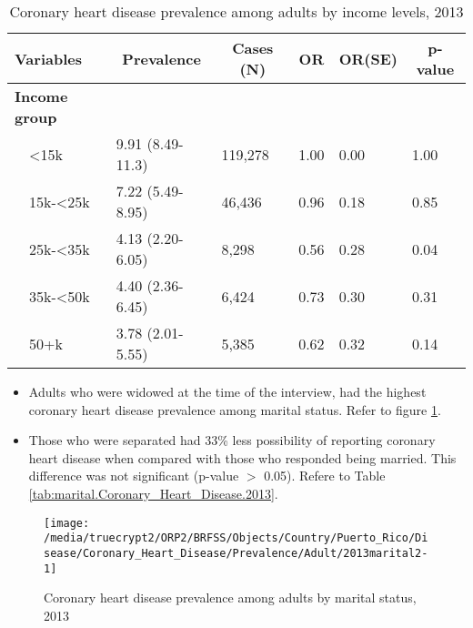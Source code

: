 \begin{table}[H]
\caption{Coronary heart disease prevalence  among adults by income levels, 2013\label{tab:income.Coronary_Heart_Disease.2013}} 
\begin{center}
\begin{tabular}{llllll}
\hline\hline
\multicolumn{1}{l}{Variables}&\multicolumn{1}{c}{Prevalence}&\multicolumn{1}{c}{Cases (N)}&\multicolumn{1}{c}{OR}&\multicolumn{1}{c}{OR(SE)}&\multicolumn{1}{c}{p-value}\tabularnewline
\hline
{\bfseries Income group}&&&&&\tabularnewline
~~\textless15k&9.91 (8.49-11.3)&119,278&1.00&0.00&1.00\tabularnewline
~~15k-\textless25k&7.22 (5.49-8.95)& 46,436&0.96&0.18&0.85\tabularnewline
~~25k-\textless35k&4.13 (2.20-6.05)&  8,298&0.56&0.28&0.04\tabularnewline
~~35k-\textless50k&4.40 (2.36-6.45)&  6,424&0.73&0.30&0.31\tabularnewline
~~50+k&3.78 (2.01-5.55)&  5,385&0.62&0.32&0.14\tabularnewline
\hline
\end{tabular}\end{center}

\end{table}

 \newpage
\begin{itemize}

\item Adults who were 
widowed at the time of the interview, had the highest coronary heart disease prevalence among marital status. Refer to figure \ref{fig:marital.Coronary_Heart_Disease.2013}.

\item Those who were separated had 33\% less possibility of reporting coronary heart disease when compared with those who responded being married. This difference was not significant (p-value $>$ 0.05). Refere to Table \ref{tab:marital.Coronary_Heart_Disease.2013}.

\end{itemize}

\begin{figure}[H]
\caption{Coronary heart disease prevalence among adults by marital status,
         2013}
\label{fig:marital.Coronary_Heart_Disease.2013}
\begin{knitrout}
\color{fgcolor}

{\centering \texttt{[image: /media/truecrypt2/ORP2/BRFSS/Objects/Country/Puerto\_Rico/Disease/Coronary\_Heart\_Disease/Prevalence/Adult/2013marital2-1]} 

}



\end{knitrout}
 \end{figure}

